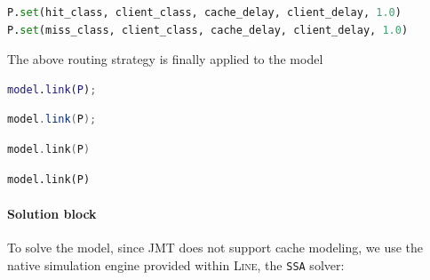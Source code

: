 \begin{PYTHON}
\begin{lstlisting}[language = python]
P.set(hit_class, client_class, cache_delay, client_delay, 1.0)
P.set(miss_class, client_class, cache_delay, client_delay, 1.0)
\end{lstlisting}
\end{PYTHON}
The above routing strategy is finally applied to the model
\begin{MATLAB}
\begin{lstlisting}[language = matlab]
model.link(P);
\end{lstlisting}
\end{MATLAB}
\begin{JAVA}
\begin{lstlisting}[language = java, basicstyle=\ttfamily\scriptsize]
model.link(P);
\end{lstlisting}
\end{JAVA}
\begin{KOTLIN}
\begin{lstlisting}[language = kotlin, basicstyle=\ttfamily\scriptsize]
model.link(P)
\end{lstlisting}
\end{KOTLIN}
\begin{PYTHON}
\begin{lstlisting}[language = python]
model.link(P)
\end{lstlisting}
\end{PYTHON}

\paragraph{Solution block}
To solve the model, since JMT does not support cache modeling, we use the native simulation engine provided within \textsc{Line}, the \texttt{SSA} solver:


